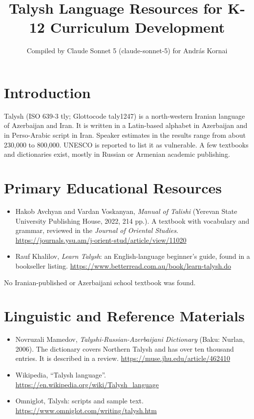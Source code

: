 \documentclass[12pt]{article}
\title{Talysh Language Resources for K-12 Curriculum Development}
\author{Compiled by Claude Sonnet 5 (claude-sonnet-5) for Andr\'as Kornai}
\date{}
\begin{document}
\maketitle

\section{Introduction}
Talysh (ISO 639-3 tly; Glottocode taly1247) is a north-western Iranian language of Azerbaijan and Iran. It is written in a Latin-based alphabet in Azerbaijan and in Perso-Arabic script in Iran. Speaker estimates in the results range from about 230,000 to 800,000. UNESCO is reported to list it as vulnerable. A few textbooks and dictionaries exist, mostly in Russian or Armenian academic publishing.

\section{Primary Educational Resources}
\begin{itemize}
\item Hakob Avchyan and Vardan Voskanyan, \emph{Manual of Talishi} (Yerevan State University Publishing House, 2022, 214 pp.). A textbook with vocabulary and grammar, reviewed in the \emph{Journal of Oriental Studies}. \url{https://journals.ysu.am/j-orient-stud/article/view/11020}
\item Rauf Khalilov, \emph{Learn Talysh}: an English-language beginner's guide, found in a bookseller listing. \url{https://www.betterread.com.au/book/learn-talysh.do}
\end{itemize}
No Iranian-published or Azerbaijani school textbook was found.

\section{Linguistic and Reference Materials}
\begin{itemize}
\item Novruzali Mamedov, \emph{Talyshi-Russian-Azerbaijani Dictionary} (Baku: Nurlan, 2006). The dictionary covers Northern Talysh and has over ten thousand entries. It is described in a review. \url{https://muse.jhu.edu/article/462410}
\item Wikipedia, ``Talysh language''. \url{https://en.wikipedia.org/wiki/Talysh_language}
\item Omniglot, Talysh: scripts and sample text. \url{https://www.omniglot.com/writing/talysh.htm}
\end{itemize}
\end{document}
